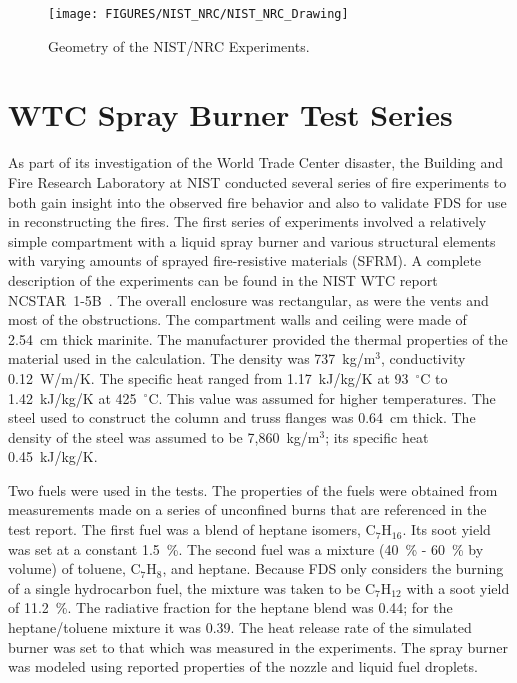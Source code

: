 \begin{sidewaysfigure}[p]
\begin{center}
\texttt{[image: FIGURES/NIST\_NRC/NIST\_NRC\_Drawing]}
\end{center}
\caption{Geometry of the NIST/NRC Experiments.}
\label{NIST_NRC_Drawing}
\end{sidewaysfigure}

\clearpage


\section{WTC Spray Burner Test Series}

As part of its investigation of the World Trade Center disaster, the Building and Fire Research Laboratory at NIST conducted several series of fire experiments to both gain insight into the
observed fire behavior and also to validate FDS for use in reconstructing the fires. The first series of experiments involved a relatively simple compartment with a liquid spray burner and
various structural elements with varying amounts of sprayed fire-resistive materials (SFRM).
A complete description of the experiments can be found in the NIST WTC report NCSTAR~1-5B~\cite{NIST_NCSTAR_1-5B}.
The overall enclosure was rectangular, as were the vents and most of the obstructions. The compartment walls and ceiling were made of 2.54~cm thick marinite. The manufacturer provided the thermal properties of the material used in the calculation. The density was 737~kg/m$^3$, conductivity 0.12~W/m/K. The specific heat ranged from 1.17~kJ/kg/K at 93~$^\circ$C to
1.42~kJ/kg/K at 425~$^\circ$C. This value was assumed for higher temperatures.
The steel used to construct the column and truss flanges was 0.64~cm thick.  The density of the steel was assumed to be 7,860~kg/m$^3$; its specific heat 0.45~kJ/kg/K.

Two fuels were used in the tests. The properties of the fuels were obtained from measurements made on a series of unconfined burns that are referenced in the test report.
The first fuel was a blend of heptane isomers, C$_7$H$_{16}$. Its soot yield was set at a constant 1.5~\%. The second fuel was a mixture (40~\% - 60~\% by volume) of toluene, C$_7$H$_8$,
and heptane. Because FDS only considers the burning of a single hydrocarbon fuel, the mixture was taken to be C$_7$H$_{12}$ with a soot yield of 11.2~\%.
The radiative fraction for the heptane blend was 0.44; for the heptane/toluene mixture it was 0.39.
The heat release rate of the simulated burner was set to that which was measured in the experiments. The spray burner was modeled using reported properties of the nozzle and
liquid fuel droplets.





